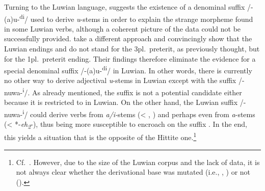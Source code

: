 \documentclass[output=paper,colorlinks,citecolor=brown]{langscibook}
\begin{document}
Turning to the Luwian language, \citet[190--199]{Sasseville2021} suggests the existence of a denominal  suffix /-(a)u-\textsuperscript{di}/ used to derive \textit{u}-stems in order to explain the strange morpheme  found in some Luwian verbs, although a coherent picture of the data could not be successfully provided. \citet{MelchertYakubovich2022} take a different approach and convincingly show that the Luwian endings  and  do not stand for the 3pl.\ preterit, as previously thought, but for the 1pl.\ preterit ending. Their findings therefore eliminate the evidence for a special denominal suffix  /-(a)u-\textsuperscript{di}/  in Luwian. In other words, there is currently no other way to derive adjectival \textit{u}-stems in Luwian except with the suffix \mbox{/-nuwa-\textsuperscript{i}/}. As already mentioned, the  suffix  is not a potential candidate either because it is restricted to  in Luwian. On the other hand, the Luwian suffix /-nuwa-\textsuperscript{i}/ could derive verbs from \textit{a/i-}stems (< , ) and perhaps even from \textit{a}-stems (< *-\textit{eh\textsubscript{2}}-), thus being more susceptible to encroach on the  suffix . In the end, this yields a situation that is the opposite of the Hittite one.\footnote{Cf.\ \citealt[471--477]{Sasseville2021}. However, due to the size of the Luwian corpus and the lack of data, it is not always clear whether the derivational base was mutated (i.e., , ) or not ().}
\end{document}
